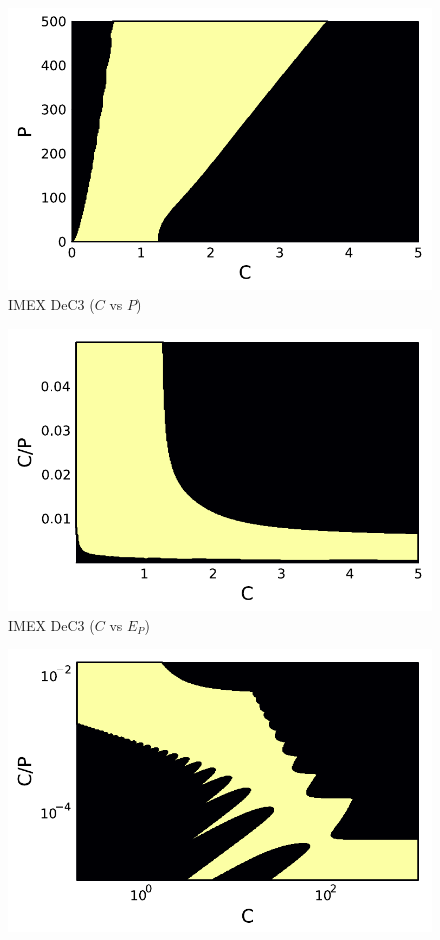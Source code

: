 \begin{example}
\begin{figure}
\begin{minipage}[t]{0.32\textwidth}
			\includegraphics[width=\textwidth]{pdf/pdepics/disp/contourf_adv_disp_IMEXDeC_equispaced_3_disp_CFD_adv_1_CP.pdf}
			IMEX DeC3 ($C$ vs $P$)
		\end{minipage} 
		\begin{minipage}[t]{0.32\textwidth}
			\centering
			\includegraphics[width=\textwidth]{pdf/pdepics/disp/contourf_adv_disp_IMEXDeC_equispaced_3_disp_CFD_adv_1_CE.pdf}
			IMEX DeC3 ($C$ vs $E_P$)
		\end{minipage}
		\begin{minipage}[t]{0.32\textwidth}
			\centering
			\includegraphics[width=\textwidth]{pdf/pdepics/disp/contourf_adv_disp_IMEXDeC_equispaced_3_disp_CFD_adv_1_CE_zoom.pdf}

\end{minipage}
\end{figure}
\end{example}
